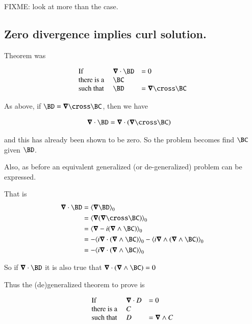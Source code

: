 \documentclass{article}
\begin{document}
FIXME: look at more than the  case.

\subsection{ Zero divergence implies curl solution. }

Theorem was

\begin{equation*}
\begin{array}{l l l}
\text{If} &                 \spacegrad \cdot \BD &= 0 \\
\text{there is a } &                         \BC &    \\
\text{such that  } & \BD &= \spacegrad \cross \BC \\
\end{array} 
\end{equation*}

As above, if $\BD = \spacegrad \cross \BC$, then we have

\begin{align*}
\spacegrad \cdot \BD &= \spacegrad \cdot (\spacegrad \cross \BC)
\end{align*}

and this has already been shown to be zero.  So the problem becomes find $\BC$ given $\BD$.

Also, as before an equivalent generalized (or de-generalized) problem can be expressed.  

That is
\begin{align*}
\spacegrad \cdot \BD 
&= \gpgradezero{\spacegrad \BD} \\
&= \gpgradezero{\spacegrad (\spacegrad \cross \BC)} \\
&= \gpgradezero{\spacegrad -i (\spacegrad \wedge \BC)} \\
&= -\gpgradezero{i\spacegrad \cdot (\spacegrad \wedge \BC)} -\gpgradezero{i\spacegrad \wedge (\spacegrad \wedge \BC)} \\
&= -\gpgradezero{i\spacegrad \cdot (\spacegrad \wedge \BC)} \\
\end{align*}

So if $\spacegrad \cdot \BD$ it is also true that $\spacegrad \cdot (\spacegrad \wedge \BC) = 0$

Thus the (de)generalized theorem to prove is

\begin{equation*}
\begin{array}{l l l}
\text{If} &                 \boldsymbol{\nabla} \cdot D &= 0 \\
\text{there is a } &                       C &    \\
\text{such that  } & D &= \boldsymbol{\nabla} \wedge C \\
\end{array} 
\end{equation*}
\end{document}
